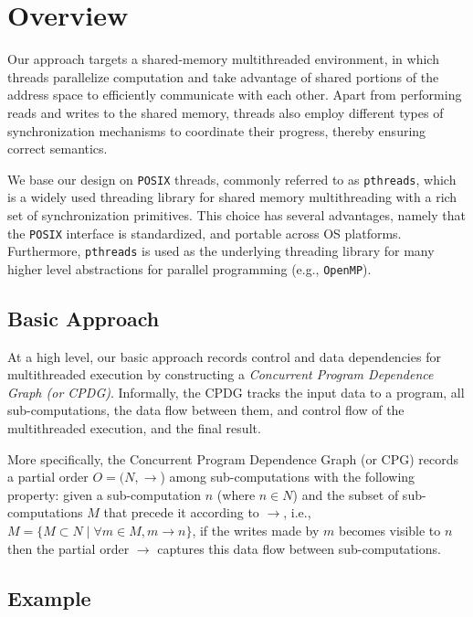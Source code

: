 \section{Overview}
\label{sec:overview}

Our approach targets a shared-memory multithreaded environment, in which threads parallelize computation and take
advantage of shared portions of the address space to efficiently communicate with each other. Apart from performing reads
and writes to the shared memory, threads also employ different types of synchronization mechanisms to
coordinate their progress, thereby ensuring correct semantics.

We base our design on {\tt POSIX} threads, commonly referred to as
{\tt pthreads}, which is a widely used threading library for shared memory
multithreading with a rich set of synchronization primitives.  This
choice has several advantages, namely that the {\tt POSIX} interface
is standardized, and portable across OS platforms. Furthermore, {\tt pthreads} is used as the underlying threading library for many higher level abstractions for parallel programming
(e.g., {\tt OpenMP}).


\subsection{Basic Approach}

At a high level, our basic approach records control and data dependencies for multithreaded execution by constructing a {\em Concurrent Program Dependence Graph (or CPDG)}. Informally, the CPDG tracks the input data to a program, all sub-computations, the data flow between them, and control flow of the multithreaded execution, and the final result.

More specifically, the Concurrent Program Dependence Graph (or CPG) records a partial order $O = (N, \rightarrow$) among sub-computations with the following property: given a sub-computation $n$ (where $n \in N $)  and the subset of sub-computations $M$ that precede it according to $\rightarrow$, i.e., $M = \{M \subset N \mid \forall m \in M, m \rightarrow n\}$, if the writes made by $m$ becomes visible to $n$ then the partial order $\rightarrow$ captures this data flow between sub-computations.




\subsection{Example}

